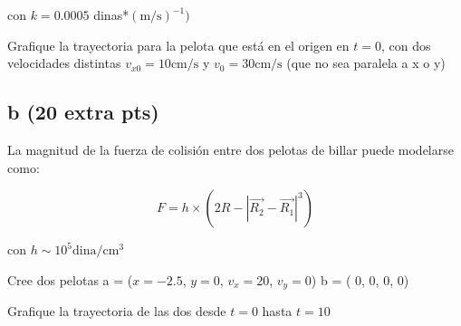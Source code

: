 \documentclass{article}
\begin{document}
con $k = 0.0005$ dinas*$(\mathrm{m/s})^{-1})$

Grafique la trayectoria para la pelota que está en el origen 
en $t=0$, con dos velocidades distintas $v_{x0} = 10 \mathrm{cm/s}$ y $v_0 = 30\mathrm{cm/s}$ (que no sea paralela a x o y)

\subsection*{b (20 extra pts)}

La magnitud de la fuerza de colisión entre dos pelotas de billar puede modelarse como:

\[ F = h \times (2R -  |\vec{R_2} - \vec{R_1}|^3) \]

con $h \sim 10^5 \mathrm{dina/cm^3}$

Cree dos pelotas 
a = ($x = -2.5$, $y = 0$, $v_x = 20$, $v_y = 0$)
b = ( 0, 0, 0, 0)

Grafique la trayectoria de las dos desde $t=0$ hasta $t=10$
\end{document}
